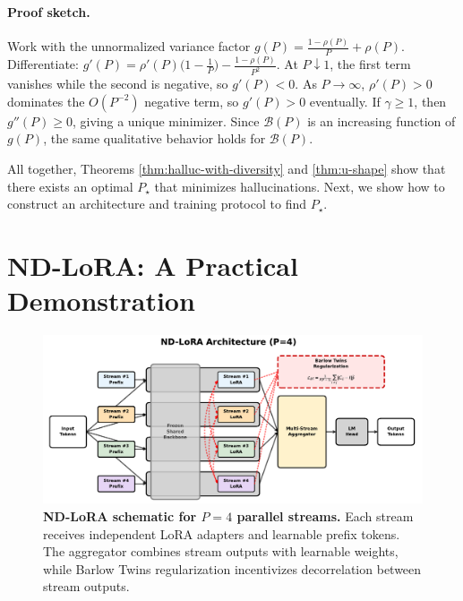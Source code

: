 \documentclass{article} %
\begin{document}
\paragraph{Proof sketch.}
Work with the unnormalized variance factor
$g(P)=\tfrac{1-\rho(P)}{P}+\rho(P)$.
Differentiate:
$g'(P)=\rho'(P)\big(1-\tfrac{1}{P}\big) - \tfrac{1-\rho(P)}{P^2}$.
At $P\downarrow 1$, the first term vanishes while the second is negative, so $g'(P)<0$.
As $P\to\infty$, $\rho'(P)>0$ dominates the $O(P^{-2})$ negative term, so $g'(P)>0$ eventually.
If $\gamma\ge 1$, then $g''(P)\ge 0$, giving a unique minimizer.
Since $\mathcal{B}(P)$ is an increasing function of $g(P)$, the same qualitative behavior holds for $\mathcal{B}(P)$.

All together, Theorems \ref{thm:halluc-with-diversity} and \ref{thm:u-shape} show that there exists an optimal
$P_{\star}$ that minimizes hallucinations. Next, we show how to construct an architecture and training
protocol to find $P_{\star}$.

\section{ND-LoRA: A Practical Demonstration}
\begin{figure}[ht]
  \begin{center}
    \includegraphics[width=1\textwidth]{assets/figure2_diagram.pdf}
  \end{center}
  \caption{
    \textbf{ND-LoRA schematic for $P=4$ parallel streams.} Each stream receives independent LoRA adapters
    and learnable prefix tokens. The aggregator combines stream outputs with learnable weights, while
    Barlow Twins regularization incentivizes decorrelation between stream outputs.
  }
  \label{fig:diagram}
\end{figure}
\end{document}
